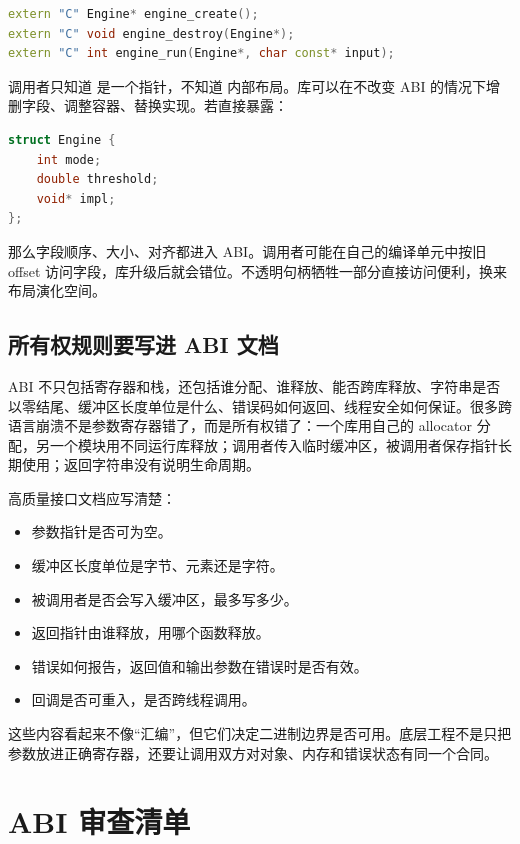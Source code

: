 \begin{lstlisting}[language=C++]
extern "C" Engine* engine_create();
extern "C" void engine_destroy(Engine*);
extern "C" int engine_run(Engine*, char const* input);
\end{lstlisting}

调用者只知道  是一个指针，不知道  内部布局。库可以在不改变 ABI 的情况下增删字段、调整容器、替换实现。若直接暴露：

\begin{lstlisting}[language=C++]
struct Engine {
    int mode;
    double threshold;
    void* impl;
};
\end{lstlisting}

那么字段顺序、大小、对齐都进入 ABI。调用者可能在自己的编译单元中按旧 offset 访问字段，库升级后就会错位。不透明句柄牺牲一部分直接访问便利，换来布局演化空间。

\subsection{所有权规则要写进 ABI 文档}

ABI 不只包括寄存器和栈，还包括谁分配、谁释放、能否跨库释放、字符串是否以零结尾、缓冲区长度单位是什么、错误码如何返回、线程安全如何保证。很多跨语言崩溃不是参数寄存器错了，而是所有权错了：一个库用自己的 allocator 分配，另一个模块用不同运行库释放；调用者传入临时缓冲区，被调用者保存指针长期使用；返回字符串没有说明生命周期。

高质量接口文档应写清楚：

\begin{itemize}
  \item 参数指针是否可为空。
  \item 缓冲区长度单位是字节、元素还是字符。
  \item 被调用者是否会写入缓冲区，最多写多少。
  \item 返回指针由谁释放，用哪个函数释放。
  \item 错误如何报告，返回值和输出参数在错误时是否有效。
  \item 回调是否可重入，是否跨线程调用。
\end{itemize}

这些内容看起来不像“汇编”，但它们决定二进制边界是否可用。底层工程不是只把参数放进正确寄存器，还要让调用双方对对象、内存和错误状态有同一个合同。

\section{ABI 审查清单}

